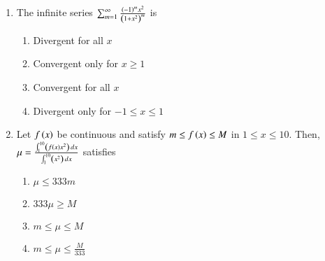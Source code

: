 \documentclass[journal,9pt,onecolumn]{IEEEtran}
\begin{document}
\begin{enumerate}
\item The infinite series $\sum_{m=1}^{\infty} \frac{\left(-1\right)^m x^2}{\left(1 + x^2\right)^m}$ is
\begin{multicols}{2}    
\begin{enumerate}
    \item Divergent for all $x$
    \item Convergent only for $x \geq 1$
    \item Convergent for all $x$
    \item Divergent only for $-1 \leq x \leq 1$
\end{enumerate}
\end{multicols}


\item Let $f\left(x\right)$ be continuous and satisfy $m \leq f\left(x\right) \leq M$ in $1 \leq x \leq 10$. Then, $\mu = \frac{\int_{1}^{10} \left(f\left(x\right) x^2\right) \, dx}{\int_{1}^{10} \left(x^2\right) \, dx}$ satisfies
\begin{multicols}{4}
\begin{enumerate}
     \item $\mu \leq 333m$
    \item $333\mu \geq M$
    \item $m \leq \mu \leq M$
    \item $m \leq \mu \leq \frac{M}{333}$
\end{enumerate}
\end{multicols}

\end{enumerate}
\end{document}
